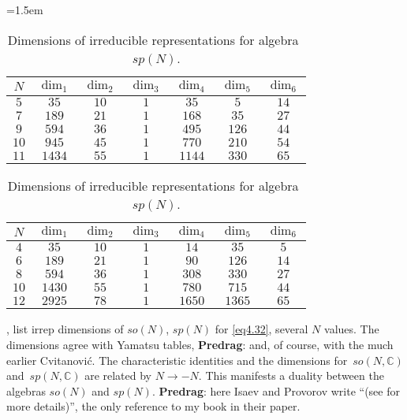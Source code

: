 \begin{description}
\begin{table}
\small\tabcolsep=1.5em
\centering
\renewcommand{\arraystretch}{1.18}
\vspace*{1mm}
\caption{\label{IsaPro20:tab1}
Dimensions of irreducible representations for algebra~$so(N)$.}
\vspace*{1mm}
\begin{tabular}{|c|c|c|c|c|c|c|}
\hline
$N$ & $\dim_1$ & $\dim_2$ & $\dim_3$ & $\dim_4$ & $\dim_5$ & $\dim_6$\\
\hline
$5$ & $35$ & $10$ & $1$ & $35$ & $5$ & $14$\\
\hline
$7$ & $189$ & $21$ & $1$ & $168$ & $35$ & $27$\\
\hline
$9$ & $594$ & $36$ & $1$ & $495$ & $126$ & $44$\\
\hline
$10$ & $945$ & $45$ & $1$ & $770$ & $210$ & $54$\\
\hline
$11$ & $1434$ & $55$ & $1$ & $1144$ & $330$ & $65$\\
\hline
\end{tabular}

\caption{\label{IsaPro20:tab2}
Dimensions of irreducible representations for algebra~$sp(N)$.}
\vspace*{1mm}
\begin{tabular}{|c|c|c|c|c|c|c|}
\hline
$N$ & $\dim_1$ & $\dim_2$ & $\dim_3$ & $\dim_4$ & $\dim_5$ & $\dim_6$\\
\hline
$4$ & $35$ & $10$ & $1$ & $14$ & $35$ & $5$\\
\hline
$6$ & $189$ & $21$ & $1$ & $90$ & $126$ & $14$\\
\hline
$8$ & $594$ & $36$ & $1$ & $308$ & $330$ & $27$\\
\hline
$10$ & $1430$ & $55$ & $1$ & $780$ & $715$ & $44$\\
\hline
$12$ & $2925$ & $78$ & $1$ & $1650$ & $1365$ & $65$\\
\hline
\end{tabular}
\end{table}
%
,  list irrep dimensions of $so(N)$, $sp(N)$
for \eqref{eq4.32}, several $N$ values. The dimensions agree with Yamatsu
tables, {\bf Predrag}: and, of course, with the much
earlier Cvitanovi{\'c}. The characteristic identities and the
dimensions  for~$so(N,\mathbb{C})$ and~$sp(N,\mathbb{C})$
are related by $N\to-N$. This manifests a duality between the algebras
$so(N)$ and $sp(N)$.
{\bf Predrag}: here Isaev and Provorov write ``(see \cite{PCgr} for more
details)'', the only reference to my book in their paper.


\end{description}
